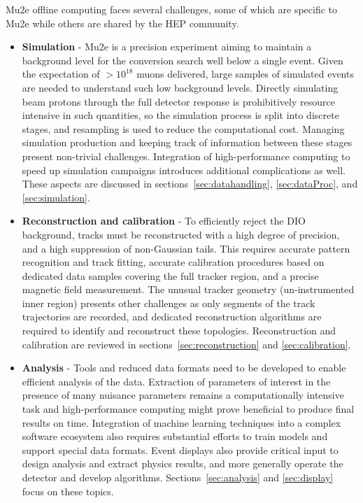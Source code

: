 Mu2e offline computing faces several challenges, some of which are specific to Mu2e while others are shared by the HEP community.

\begin{itemize}

\item[] {\bf Simulation} - Mu2e is a precision experiment aiming to maintain a background level for the conversion search well below a single event. Given the expectation of $>10^{18}$ muons delivered, large samples of simulated events are needed to understand such low background levels. Directly simulating beam protons through the full detector response is prohibitively resource intensive in such quantities, so the simulation process is split into discrete stages, and resampling is used to reduce the computational cost. Managing simulation production and keeping track of information between these stages present non-trivial challenges. Integration of high-performance computing to speed up simulation campaigns introduces additional complications as well. These aspects are discussed in sections~\ref{sec:datahandling}, \ref{sec:dataProc}, and \ref{sec:simulation}.

\item[] {\bf Reconstruction and calibration} - To efficiently reject the DIO background, tracks must be reconstructed with a high degree of precision, and a high suppression of non-Gaussian tails. This requires accurate pattern recognition and track fitting, accurate calibration procedures based on dedicated data samples covering the full tracker region, and a precise magnetic field measurement. The unusual tracker geometry (un-instrumented inner region) presents other challenges as only segments of the track trajectories are recorded, and dedicated reconstruction algorithms are required to identify and reconstruct these topologies. Reconstruction and calibration are reviewed in sections~\ref{sec:reconstruction} and \ref{sec:calibration}.
 
\item[] {\bf Analysis} - Tools and reduced data formats need to be developed to enable efficient analysis of the data. Extraction of parameters of interest in the presence of many nuisance parameters remains a computationally intensive task and high-performance computing might prove beneficial to produce final results on time. Integration of machine learning techniques into a complex software ecosystem also requires substantial efforts to train models and support special data formats. Event displays also provide critical input to design analysis and extract physics results, and more generally operate the detector and develop algorithms. Sections~\ref{sec:analysis} and \ref{sec:display} focus on these topics.


\end{itemize}
